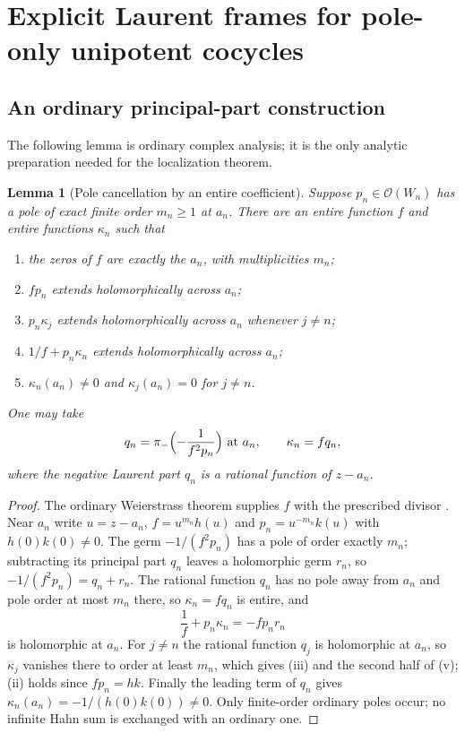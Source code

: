 \documentclass[11pt,letterpaper]{article}
\newtheorem{lemma}[lemma]{Lemma}
\theoremstyle{definition}
\theoremstyle{remark}
\newcommand{\OO}{\mathcal O}
\numberwithin{equation}{section}
\begin{document}
\section{Explicit Laurent frames for pole-only unipotent cocycles}
\label{nab:pl:sec:frames}

\subsection{An ordinary principal-part construction}

The following lemma is ordinary complex analysis; it is the only analytic
preparation needed for the localization theorem.

\begin{lemma}[Pole cancellation by an entire coefficient]\label{nab:pl:lem:principal}
Suppose $p_n\in\OO(W_n)$ has a pole of exact finite order $m_n\geq1$ at $a_n$.
There are an entire function $f$ and entire functions $\kappa_n$ such that
\begin{enumerate}[label=\textup{(\roman*)}]
\item the zeros of $f$ are exactly the $a_n$, with multiplicities $m_n$;
\item $fp_n$ extends holomorphically across $a_n$;
\item $p_n\kappa_j$ extends holomorphically across $a_n$ whenever $j\neq n$;
\item $1/f+p_n\kappa_n$ extends holomorphically across $a_n$;
\item $\kappa_n(a_n)\neq0$ and $\kappa_j(a_n)=0$ for $j\neq n$.
\end{enumerate}
One may take
\begin{equation}\label{nab:pl:eq:kappa}
 q_n=\pi_-\Bigl(-\frac1{f^2p_n}\Bigr)\ \text{at }a_n,\qquad \kappa_n=fq_n,
\end{equation}
where the negative Laurent part $q_n$ is a rational function of $z-a_n$.
\end{lemma}

\begin{proof}
The ordinary Weierstrass theorem supplies $f$ with the prescribed divisor
\cite{Rudin,Greenfield}. Near $a_n$ write $u=z-a_n$,
$f=u^{m_n}h(u)$ and $p_n=u^{-m_n}k(u)$ with $h(0)k(0)\neq0$. The germ
$-1/(f^2p_n)$ has a pole of order exactly $m_n$; subtracting its principal
part $q_n$ leaves a holomorphic germ $r_n$, so $-1/(f^2p_n)=q_n+r_n$. The
rational function $q_n$ has no pole away from $a_n$ and pole order at most $m_n$
there, so $\kappa_n=fq_n$ is entire, and
\begin{equation}\label{nab:pl:eq:cancellation}
 \frac1f+p_n\kappa_n=-fp_nr_n
\end{equation}
is holomorphic at $a_n$. For $j\neq n$ the rational function $q_j$ is
holomorphic at $a_n$, so $\kappa_j$ vanishes there to order at least $m_n$,
which gives (iii) and the second half of (v); (ii) holds since $fp_n=hk$.
Finally the leading term of $q_n$ gives $\kappa_n(a_n)=-1/(h(0)k(0))\neq0$.
Only finite-order ordinary poles occur; no infinite Hahn sum is exchanged with
an ordinary one.
\end{proof}
\end{document}
